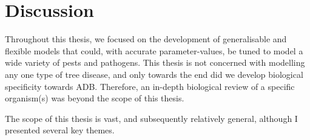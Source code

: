 
\chapter{Discussion}
Throughout this thesis, we focused on the development of generalisable and flexible models that could, with accurate parameter-values, be tuned to model a wide variety of pests and pathogens. This thesis is not concerned with modelling any one type of tree disease, and only towards the end did we develop biological specificity towards ADB. Therefore, an in-depth biological review of a specific organism(s) was beyond the scope of this thesis.


The scope of this thesis is vast, and subsequently relatively general, although I presented several key themes.






